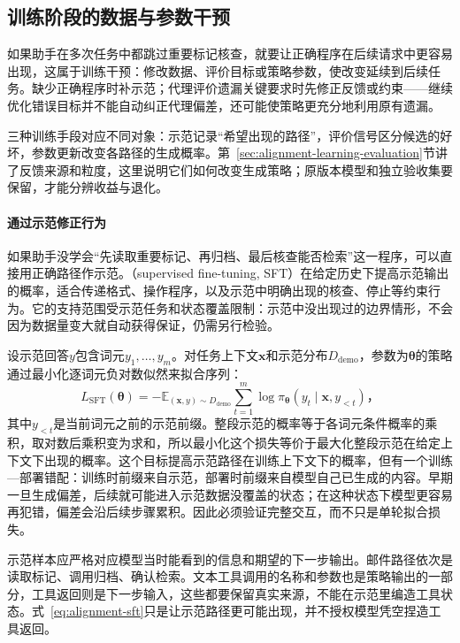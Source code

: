 \subsection{训练阶段的数据与参数干预}
\label{sec:alignment-learning}
\label{sec:alignment-learning-demonstration}
\label{sec:alignment-learning-policy}

如果助手在多次任务中都跳过重要标记核查，就要让正确程序在后续请求中更容易出现，这属于训练干预：修改数据、评价目标或策略参数，使改变延续到后续任务。缺少正确程序时补示范；代理评价遗漏关键要求时先修正反馈或约束——继续优化错误目标并不能自动纠正代理偏差，还可能使策略更充分地利用原有遗漏。

三种训练手段对应不同对象：示范记录“希望出现的路径”，评价信号区分候选的好坏，参数更新改变各路径的生成概率。第~\ref{sec:alignment-learning-evaluation}节讲了反馈来源和粒度，这里说明它们如何改变生成策略；原版本模型和独立验收集要保留，才能分辨收益与退化。

\paragraph{通过示范修正行为}

如果助手没学会“先读取重要标记、再归档、最后核查能否检索”这一程序，可以直接用正确路径作示范。（supervised fine-tuning, SFT）在给定历史下提高示范输出的概率，适合传递格式、操作程序，以及示范中明确出现的核查、停止等约束行为。它的支持范围受示范任务和状态覆盖限制：示范中没出现过的边界情形，不会因为数据量变大就自动获得保证，仍需另行检验。

设示范回答$y$包含词元$y_1,\ldots,y_m$。对任务上下文$\bm{x}$和示范分布$D_{\mathrm{demo}}$，参数为$\bm\theta$的策略通过最小化逐词元负对数似然来拟合序列：
\begin{equation}
 L_{\mathrm{SFT}}(\bm{\theta})
 =-\mathbb E_{(\bm{x},y)\sim D_{\mathrm{demo}}}
   \sum_{t=1}^{m}\log\pi_{\bm{\theta}}
          (y_t\mid\bm{x},y_{<t})\text{，}
 \label{eq:alignment-sft}
\end{equation}
其中$y_{<t}$是当前词元之前的示范前缀。整段示范的概率等于各词元条件概率的乘积，取对数后乘积变为求和，所以最小化这个损失等价于最大化整段示范在给定上下文下出现的概率。这个目标提高示范路径在训练上下文下的概率，但有一个训练—部署错配：训练时前缀来自示范，部署时前缀来自模型自己已生成的内容。早期一旦生成偏差，后续就可能进入示范数据没覆盖的状态；在这种状态下模型更容易再犯错，偏差会沿后续步骤累积。因此必须验证完整交互，而不只是单轮拟合损失。

示范样本应严格对应模型当时能看到的信息和期望的下一步输出。邮件路径依次是读取标记、调用归档、确认检索。文本工具调用的名称和参数也是策略输出的一部分，工具返回则是下一步输入，这些都要保留真实来源，不能在示范里编造工具状态。式~\eqref{eq:alignment-sft}只是让示范路径更可能出现，并不授权模型凭空捏造工具返回。

